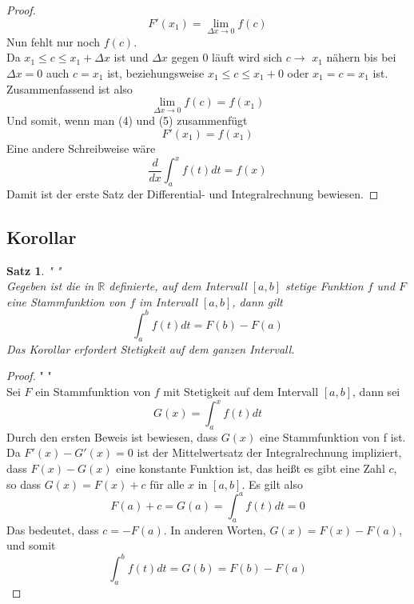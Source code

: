\documentclass[fontsize=12pt,paper=a4,DIV12,cleardoublepage=empty, 
liststotoc,idxtotoc,bibtotoc]{article}
\newcommand{\RR}{\mathbb{R}}
\theoremstyle{plain}
\newtheorem{satz}{Satz}[subsection]
\theoremstyle{definition}
\begin{document}
\begin{proof}
\begin{equation}
			F'(x_1)=\lim \limits_{\Delta x \to 0}f(c)
		\end{equation}
		Nun fehlt nur noch $f(c)$.\\ Da $x_1 \leq c \leq x_1+\Delta x$ ist und $\Delta x$ gegen $0$ läuft wird sich $c\to$ $x_1$ nähern bis bei $\Delta x=0$ auch $c = x_1$ ist, beziehungsweise $x_1 \leq c \leq x_1 + 0$ oder $x_1 = c = x_1$ ist.\\Zusammenfassend ist also
		\begin{equation}
			\lim \limits_{\Delta x \to 0} f(c) = f(x_1)
		\end{equation}
		Und somit, wenn man (4) und (5) zusammenfügt
		\begin{equation*}
			F'(x_1)=f(x_1)
		\end{equation*}
		Eine andere Schreibweise wäre
		\begin{equation*}
			\frac{d}{dx}\int_{a}^{x}f(t)dt=f(x)
		\end{equation*}
		Damit ist der erste Satz der Differential- und Integralrechnung bewiesen.
	\end{proof}
	\newpage
	
	
	\subsection{Korollar}
	\begin{satz}" "\\
		Gegeben ist die in $\RR$ definierte, auf dem Intervall $[a, b]$ stetige Funktion $f$  und $F$ eine Stammfunktion von $f$ im Intervall $[a, b]$, dann gilt
		\begin{equation*}
			\int_{a}^{b}f(t)dt=F(b)-F(a)
		\end{equation*}
		Das Korollar erfordert Stetigkeit auf dem ganzen Intervall.
	\end{satz}

	\begin{proof}" "\\
		Sei $F$ ein Stammfunktion von $f$ mit Stetigkeit auf dem Intervall $[a, b]$, dann sei
		\begin{equation*}
			G(x)=\int_{a}^{x}f(t)dt
		\end{equation*}
		Durch den ersten Beweis ist bewiesen, dass $G(x)$ eine Stammfunktion von f ist. Da $F'(x)-G'(x)=0$ ist der Mittelwertsatz der Integralrechnung impliziert, dass $F(x)-G(x)$ eine konstante Funktion ist, das heißt es gibt eine Zahl $c$, so dass $G(x)=F(x)+c$ für alle $x$ in $[a, b]$. Es gilt also
		\begin{equation*}
			F(a)+c=G(a)=\int_{a}^{a}f(t)dt=0
		\end{equation*}
		Das bedeutet, dass $c=-F(a)$. In anderen Worten, $G(x)=F(x)-F(a)$, und somit
		\begin{equation*}
			\int_{a}^{b}f(t)dt=G(b)=F(b)-F(a)
		\end{equation*}
	\end{proof}	
	\newpage
	
\end{document}
